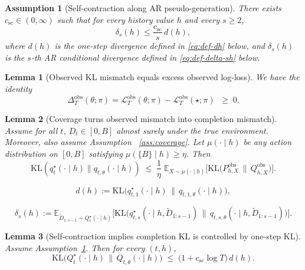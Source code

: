 \documentclass[10pt,a4paper]{amsart}
\newtheorem{assumption}{Assumption}
\newtheorem{lemma}{Lemma}
\begin{document}
\begin{assumption}[Self-contraction along AR pseudo-generation]\label{ass:self-contraction}
There exists $c_{\mathrm{sc}}\in(0,\infty)$ such that for every history value $h$ and every $s\ge 2$,
\[
\delta_s(h) \le \frac{c_{\mathrm{sc}}}{s}\, d(h),
\]
where $d(h)$ is the one-step divergence defined in \eqref{eq:def-dh} below, and $\delta_s(h)$ is the $s$-th AR conditional divergence
defined in \eqref{eq:def-delta-sh} below.
\end{assumption}

\begin{lemma}[Observed KL mismatch equals excess observed log-loss]\label{lem:delta-obs-excess-Lobs}
We have the identity
\[
\Delta^{\mathrm{obs}}_T(\theta;\pi)
=
\mathcal{L}^{\mathrm{obs}}_T(\theta;\pi)
-
\mathcal{L}^{\mathrm{obs}}_T(\star;\pi)
\;\;\ge\; 0.
\]
\end{lemma}

\begin{lemma}[Coverage turns observed mismatch into completion mismatch]\label{lem:coverage-obs-to-latent}
Assume for all $t$, $D_t\in[0,B]$ almost surely under the true environment. Moreover, also assume Assumption ~\ref{ass:coverage}. Let $\mu(\cdot\mid h)$ be any action distribution on $[0,B]$ satisfying $\mu(\{B\}\mid h)\ge\eta$.
Then
\begin{equation}\label{eq:latent-by-obs}
\mathrm{KL}(q_t^\star(\cdot\mid h)\|q_{t,\theta}(\cdot\mid h))
\;\le\;
\frac{1}{\eta}\;
\mathbb{E}_{X\sim \mu(\cdot\mid h)}
\Big[\mathrm{KL}\big(P^{\mathrm{obs}}_{h,X}\,\|\,Q^{\mathrm{obs}}_{h,X}\big)\Big].
\end{equation}
\end{lemma}

\begin{equation}\label{eq:def-dh}
d(h) := \mathrm{KL}\big(q^\star_{t,1}(\cdot\mid h)\,\|\,q_{t,1,\theta}(\cdot\mid h)\big),
\end{equation}

\begin{equation}\label{eq:def-delta-sh}
\delta_s(h)
:= \mathbb{E}_{\tilde D_{1:s-1}\sim Q^\star_t(\cdot\mid h)}
\Big[
\mathrm{KL}\big(q^\star_{t,s}(\cdot\mid h,\tilde D_{1:s-1})\,\|\,q_{t,s,\theta}(\cdot\mid h,\tilde D_{1:s-1})\big)
\Big].
\end{equation}

\begin{lemma}[Self-contraction implies completion KL is controlled by one-step KL]\label{lem:self-contraction-bound}
Assume Assumption~\ref{ass:self-contraction}. Then for every $(t,h)$,
\[
\mathrm{KL}\big(Q^\star_t(\cdot\mid h)\,\|\,Q_{t,\theta}(\cdot\mid h)\big)
\;\le\;
\bigl(1 + c_{\mathrm{sc}}\log T\bigr)\, d(h).
\]
\end{lemma}
\end{document}
